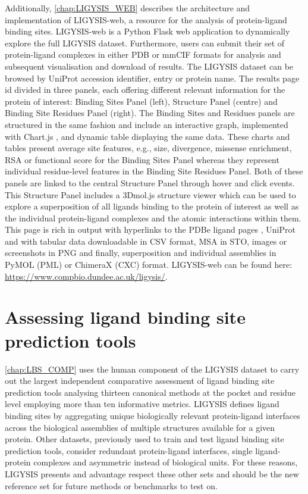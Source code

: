 Additionally, \autoref{chap:LIGYSIS_WEB} describes the architecture and implementation of LIGYSIS-web, a resource for the analysis of protein-ligand binding sites. LIGYSIS-web is a Python Flask \cite{GRINBERG_2018_FLASK} web application to dynamically explore the full LIGYSIS dataset. Furthermore, users can submit their set of protein-ligand complexes in either PDB or mmCIF formats for analysis and subsequent visualisation and download of results. The LIGYSIS dataset can be browsed by UniProt accession identifier, entry or protein name. The results page id divided in three panels, each offering different relevant information for the protein of interest: Binding Sites Panel (left), Structure Panel (centre) and Binding Site Residues Panel (right). The Binding Sites and Residues panels are structured in the same fashion and include an interactive graph, implemented with Chart.js \cite{CHARTJS}, and dynamic table displaying the same data. These charts and tables present average site features, e.g., size, divergence, missense enrichment, RSA or functional score for the Binding Sites Panel whereas they represent individual residue-level features in the Binding Site Residues Panel. Both of these panels are linked to the central Structure Panel through hover and click events. This Structure Panel includes a 3Dmol.js \cite{REGO_2014_3DMOL} structure viewer which can be used to explore a superposition of all ligands binding to the protein of interest as well as the individual protein-ligand complexes and the atomic interactions within them. This page is rich in output with hyperlinks to the PDBe ligand pages \cite{CHOUDHARY_2024_PDBETOOLS}, UniProt and with tabular data downloadable in CSV format, MSA in STO, images or screenshots in PNG and finally, superposition and individual assemblies in PyMOL (PML) or ChimeraX (CXC) format. LIGYSIS-web can be found here: \url{https://www.compbio.dundee.ac.uk/ligysis/}.

\section{Assessing ligand binding site prediction tools}

\autoref{chap:LBS_COMP} uses the human component of the LIGYSIS dataset to carry out the largest independent comparative assessment of ligand binding site prediction tools analysing thirteen canonical methods at the pocket and residue level employing more than ten informative metrics. LIGYSIS defines ligand binding sites by aggregating unique biologically relevant protein-ligand interfaces across the biological assemblies of multiple structures available for a given protein. Other datasets, previously used to train and test ligand binding site prediction tools, consider redundant protein-ligand interfaces, single ligand-protein complexes and asymmetric instead of biological units. For these reasons, LIGYSIS presents and advantage respect these other sets and should be the new reference set for future methods or benchmarks to test on.

